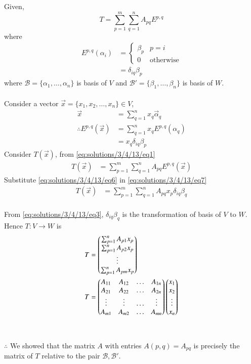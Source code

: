 Given,
\begin{equation}\label{eq:solutions/3/4/13/eq1}
	T = \displaystyle \sum_{p=1}^m \displaystyle \sum_{q=1}^n A_{pq}E^{p,q}
\end{equation}
where
\begin{align}
	E^{p,q}(\alpha_i) &=
	\begin{cases}
	\beta_p & p=i\\
	0 & \text{otherwise}
	\end{cases}\\
	\label{eq:solutions/3/4/13/eq3}&= \delta_{iq}\beta_p
\end{align}
where $\mathcal{B} = \{\alpha_1, \dots, \alpha_n\}$ is basis of $V$ and $\mathcal{B}' = \{\beta_1, \dots, \beta_n\}$ is basis of $W$.
\\
\\
Consider a vector $\vec{x} = \{x_1, x_2, \dots, x_n\} \in V$,
\begin{align}\label{eq:solutions/3/4/13/eq4}
	\vec{x} &= \displaystyle\sum_{q=1}^{n}x_q \vec{\alpha}_q\\
	\therefore E^{p,q}(\vec{x}) &= \displaystyle\sum_{q=1}^{n}x_qE^{p,q}(\alpha_q)\\
	\label{eq:solutions/3/4/13/eq6}&= x_q \delta_{iq}\beta_p
\end{align}
Consider $T(\vec{x})$, from \eqref{eq:solutions/3/4/13/eq1}
\begin{align}\label{eq:solutions/3/4/13/eq7}
	T(\vec{x}) 
	&= \displaystyle \sum_{p=1}^m \displaystyle \sum_{q=1}^n A_{pq}E^{p,q}(\vec{x})
\end{align}
Substitute \eqref{eq:solutions/3/4/13/eq6} in \eqref{eq:solutions/3/4/13/eq7}
\begin{align}\label{eq:solutions/3/4/13/eq8}
	T(\vec{x}) &= \displaystyle \sum_{p=1}^m \displaystyle \sum_{q=1}^n A_{pq}x_p \delta_{iq}\beta_q
\end{align}
\\
From \eqref{eq:solutions/3/4/13/eq3}, $\delta_{iq}\beta_q$ is the transformation of basis of $V$ to $W$. Hence $T: V \rightarrow W$ is\\
\begin{align}
	T &= \begin{pmatrix}\sum_{p=1}^nA_{p1}x_p\\\sum_{p=1}^nA_{p2}x_p\\\vdots\\\sum_{p=1}^nA_{pm}x_p\end{pmatrix}\\
	T &= \begin{pmatrix}A_{11} & A_{12} & \dots & A_{1n}\\
	A_{21} & A_{22} & \dots & A_{2n}\\
	\vdots & \vdots & \dots & \vdots\\
	A_{m1} & A_{m2} & \dots & A_{mn}\end{pmatrix}\begin{pmatrix}x_1\\x_2\\\vdots\\x_n\end{pmatrix}
\end{align}
\\\\
$\therefore$ We showed that the matrix $A$ with entries $A(p,q) = A_{pq}$ is precisely the matrix of $T$ relative to the pair $\mathcal{B},\mathcal{B}'$.
